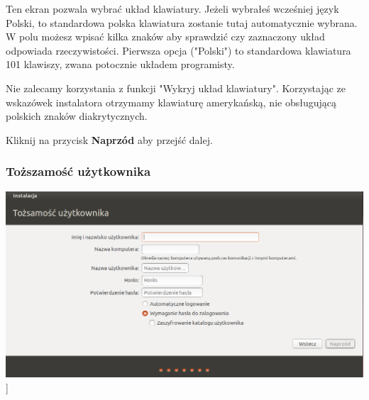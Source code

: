 Ten ekran pozwala wybrać układ klawiatury. Jeżeli wybrałeś wcześniej język Polski, to standardowa polska klawiatura zostanie tutaj automatycznie wybrana. W polu możesz wpisać kilka znaków aby sprawdzić czy zaznaczony układ odpowiada rzeczywistości. Pierwsza opcja ("Polski") to standardowa klawiatura 101 klawiszy, zwana potocznie układem programisty.

Nie zalecamy korzystania z funkcji "Wykryj układ klawiatury". Korzystając ze wskazówek instalatora otrzymamy klawiaturę amerykańską, nie obsługującą polskich znaków diakrytycznych.

\begin{flushright}
Kliknij na przycisk \textbf{Naprzód} aby przejść dalej.
\end{flushright}
\clearpage

\subsubsection{Toższamość użytkownika}
\begin{center}
	\includegraphics[scale=0.5]{images/instalator_dane.png}]
\end{center}

